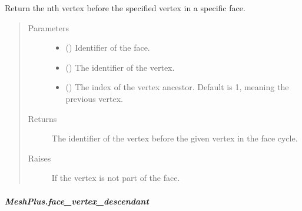 \documentclass[letterpaper,10pt,english]{sphinxmanual}
\begin{document}
\begin{fulllineitems}
\begin{fulllineitems}
\label{\detokenize{api/generated/directional_clustering.mesh.MeshPlus.face_vertex_ancestor:directional_clustering.mesh.MeshPlus.face_vertex_ancestor}}
Return the n\sphinxhyphen{}th vertex before the specified vertex in a specific face.
\begin{quote}\begin{description}
\item[{Parameters}] \leavevmode\begin{itemize}
\item {} 
 () \textendash{} Identifier of the face.

\item {} 
 () \textendash{} The identifier of the vertex.

\item {} 
 () \textendash{} The index of the vertex ancestor. Default is 1, meaning the previous vertex.

\end{itemize}

\item[{Returns}] \leavevmode
{} \textendash{} The identifier of the vertex before the given vertex in the face cycle.

\item[{Raises}] \leavevmode
{} \textendash{} If the vertex is not part of the face.

\end{description}\end{quote}

\end{fulllineitems}



\subparagraph{MeshPlus.face\_vertex\_descendant}
\label{\detokenize{api/generated/directional_clustering.mesh.MeshPlus.face_vertex_descendant:meshplus-face-vertex-descendant}}\label{\detokenize{api/generated/directional_clustering.mesh.MeshPlus.face_vertex_descendant::doc}}


\end{fulllineitems}
\end{document}
